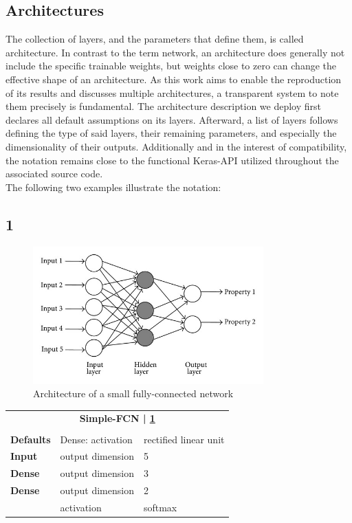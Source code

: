 \subsection{Architectures}
The collection of layers, and the parameters that define them, is called architecture. In contrast to the term network, an architecture does generally not include the specific trainable weights, but weights close to zero can change the effective shape of an architecture.
As this work aims to enable the reproduction of its results and discusses multiple architectures, a transparent system to note them precisely is fundamental. The architecture description we deploy first declares all default assumptions on its layers. Afterward, a list of layers follows defining the type of said layers, their remaining parameters, and especially the dimensionality of their outputs. Additionally and in the interest of compatibility, the notation remains close to the functional Keras-API utilized throughout the associated source code.\\
The following two examples illustrate the notation:

\subsection*{1}
\begin{figure}[h]
	\centering
	\includegraphics[height=200px]{gfx/Dense_FFNetwork.jpg}
	\caption{Architecture of a small fully-connected network\\
		\cite{dense_network}}
	\label{fig:FFNetwork}
\end{figure}
\begin{tabularx}{\textwidth}[!h]{X X X}
	\multicolumn{3}{c}{\textbf{Simple-FCN | \ref{fig:FFNetwork}}}\\
	\\
	\hline
	\endhead
	\textbf{Defaults} & Dense: activation & rectified linear unit\\
	\hline
	\textbf{Input} & output dimension & 5\\
	[8pt]
	\textbf{Dense} & output dimension & 3\\
	[8pt]
	\textbf{Dense} & output dimension & 2\\
	& activation & softmax\\
	\hline
\end{tabularx}

